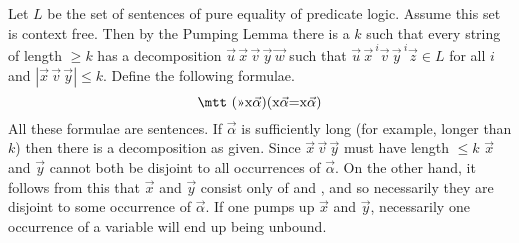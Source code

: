 \proofbeg
Let $L$ be the set of sentences of pure equality of predicate
logic. Assume this set is context free. Then by the Pumping Lemma
there is a $k$ such that every string of length $\geq k$ has a
decomposition $\vec{u}\,\vec{x}\,\vec{v}\,\vec{y}\,\vec{w}$ such that
$\vec{u}\,{\vec{x}\,}^i\vec{v}\,{\vec{y}\,}^i\vec{z} \in L$ for all $i$
and $|\vec{x}\,\vec{v}\,\vec{y}| \leq k$.  Define the following
formulae.
\begin{equation}
\mbox{\mtt (\symbol{20}x$\vec{\alpha}$)(x$\vec{\alpha}$=x$\vec{\alpha}$)}
\end{equation}
All these formulae are sentences. If $\vec{\alpha}$ is sufficiently
long (for example, longer than $k$) then there is a decomposition
as given. Since $\vec{x}\,\vec{v}\,\vec{y}$ must have length $\leq k$
$\vec{x}$ and $\vec{y}$ cannot both be disjoint to all occurrences of
$\vec{\alpha}$. On the other hand, it follows from this that
$\vec{x}$ and $\vec{y}$ consist only of {} and {}, and so
necessarily they are disjoint to some occurrence of $\vec{\alpha}$.
If one pumps up $\vec{x}$ and $\vec{y}$, necessarily one occurrence
of a variable will end up being unbound.
\proofend

